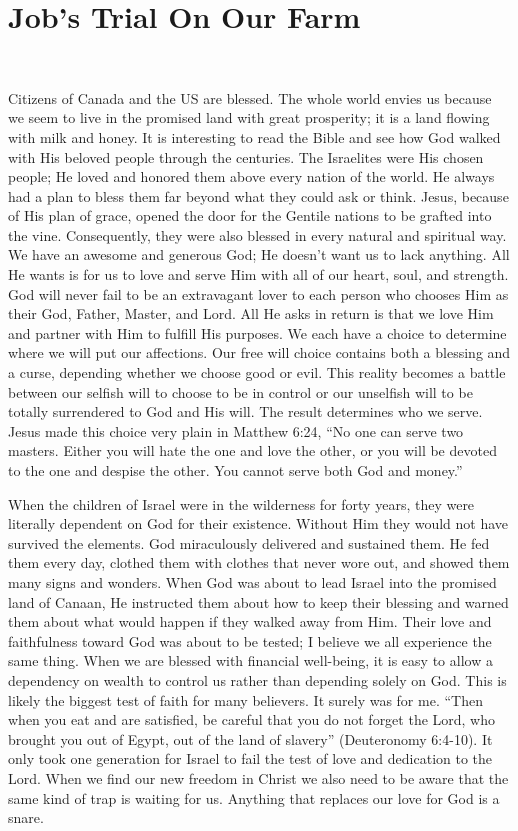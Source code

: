 \documentclass[twoside, 12pt]{book}
\begin{document}
\chapter{Job's Trial On Our Farm}
\

Citizens of Canada and the US are blessed. The whole world envies us because we seem to live in the promised land with great prosperity; it is a land flowing with milk and honey. It is  interesting to read the Bible and see how God walked with His beloved people through the centuries. The Israelites were His chosen people; He loved and honored them above every nation of the world. He always had a plan to bless them far beyond what they could ask or think. Jesus, because of His plan of grace, opened the door for the Gentile nations to be grafted into the vine. Consequently, they were also blessed in every natural and spiritual way. We have an awesome and generous God; He doesn’t want us to lack anything. All He wants is for us to love and serve Him with all of our heart, soul, and strength. God will never fail to be an extravagant lover to each person who chooses Him as their God, Father, Master, and Lord. All He asks in return is that we love Him and partner with Him to fulfill His purposes. We each have a choice to determine where we will put our affections. Our free will choice contains both a blessing and a curse, depending whether we choose good or evil. This reality becomes a battle between our selfish will to choose to be in control or our unselfish will to be totally surrendered to God and His will. The result determines who we serve. Jesus made this choice very plain in Matthew 6:24, “No one can serve two masters. Either you will hate the one and love the other, or you will be devoted to the one and despise the other. You cannot serve both God and money.”

When the children of Israel were in the wilderness for forty years, they were literally dependent on God for their existence. Without Him they would not have survived the elements. God miraculously delivered and sustained them. He fed them every day, clothed them with clothes that never wore out, and showed them many signs and wonders. When God was about to lead Israel into the promised land of Canaan, He instructed them about how to keep their blessing and warned them about what would happen if they walked away from Him. Their love and faithfulness toward God was about to be tested; I believe we all experience the same thing. When we are blessed with financial well-being, it is easy to allow a dependency on wealth to control us rather than depending solely on God. This is likely the biggest test of faith for many believers. It surely was for me. “Then when you eat and are satisfied, be careful that you do not forget the Lord, who brought you out of Egypt, out of the land of slavery” (Deuteronomy 6:4-10). It only took one generation for Israel to fail the test of love and dedication to the Lord. When we find our new freedom in Christ we also need to be aware that the same kind of trap is waiting for us. Anything that replaces our love for God is a snare. 
\end{document}
